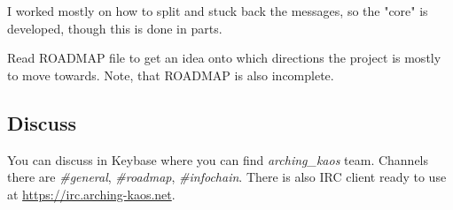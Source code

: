 \documentclass[10pt,a4paper]{paper}
\begin{document}
I worked mostly on how to split and stuck back the messages, so the "core" is developed, though this is done in parts.

Read ROADMAP file to get an idea onto which directions the project is mostly to move towards. Note, that ROADMAP is also incomplete.

\subsection{Discuss}
You can discuss in Keybase where you can find \textit{arching\_kaos} team.
Channels there are \textit{\#general}, \textit{\#roadmap}, \textit{\#infochain}. There is also IRC
client ready to use at \url{https://irc.arching-kaos.net}.
\end{document}
